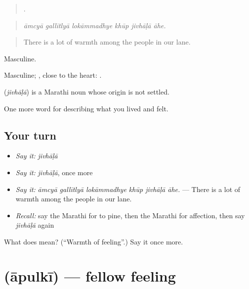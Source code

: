\begin{quote}
     .
\end{quote}

\begin{quote}
\emph{āmcyā gallītlyā lokāmmadhye khūp jivhāḷā āhe.}
\end{quote}

\begin{quote}
There is a lot of warmth among the people in our lane.
\end{quote}

Masculine.

Masculine; , close to the heart:  .

\begin{cousinweb}
\textbf{} (\emph{jivhāḷā}) is a Marathi noun whose origin is not settled.
\end{cousinweb}

\begin{grammarlens}[title={What you've built}]
One more word for describing what you lived and felt.
\end{grammarlens}

\subsection*{Your turn}
\begin{itemize}
\raggedright
  \item \emph{Say it:} \emph{jivhāḷā}
  \item \emph{Say it:} \emph{jivhāḷā}, once more
  \item \emph{Say it:} \emph{āmcyā gallītlyā lokāmmadhye khūp jivhāḷā āhe.} — There is a lot of warmth among the people in our lane.
  \item \emph{Recall:} say the Marathi for to pine, then the Marathi for affection, then say \emph{jivhāḷā} again
\end{itemize}

\begin{tcolorbox}[breakable,colback=teal!4,colframe=teal!35!black,title={Before you move on}]
What does  mean? (\textquotedblleft{}Warmth of feeling\textquotedblright{}.) Say it once more.
\end{tcolorbox}
\section[\texorpdfstring{\mr{आपुलकी} (āpulkī)}{आपुलकी (āpulkī)}]{ (āpulkī) — fellow feeling}

